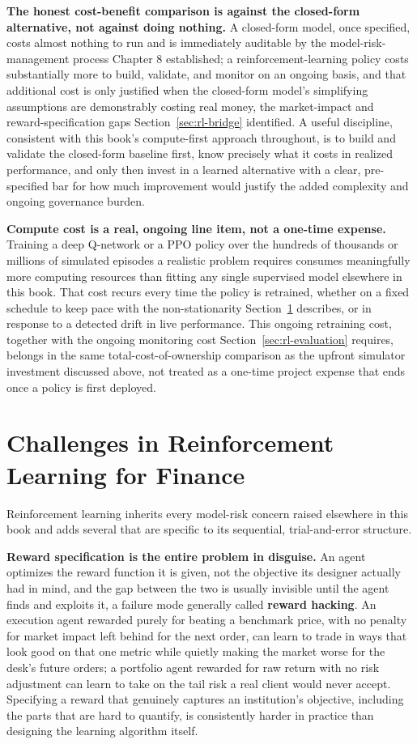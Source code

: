 \documentclass[../ai_in_finance]{subfiles}
\begin{document}
\textbf{The honest cost-benefit comparison is against the closed-form alternative, not against doing nothing.} A closed-form model, once specified, costs almost nothing to run and is immediately auditable by the model-risk-management process Chapter 8 established; a reinforcement-learning policy costs substantially more to build, validate, and monitor on an ongoing basis, and that additional cost is only justified when the closed-form model's simplifying assumptions are demonstrably costing real money, the market-impact and reward-specification gaps Section~\ref{sec:rl-bridge} identified. A useful discipline, consistent with this book's compute-first approach throughout, is to build and validate the closed-form baseline first, know precisely what it costs in realized performance, and only then invest in a learned alternative with a clear, pre-specified bar for how much improvement would justify the added complexity and ongoing governance burden.

\textbf{Compute cost is a real, ongoing line item, not a one-time expense.} Training a deep Q-network or a PPO policy over the hundreds of thousands or millions of simulated episodes a realistic problem requires consumes meaningfully more computing resources than fitting any single supervised model elsewhere in this book. That cost recurs every time the policy is retrained, whether on a fixed schedule to keep pace with the non-stationarity Section~\ref{sec:rl-challenges} describes, or in response to a detected drift in live performance. This ongoing retraining cost, together with the ongoing monitoring cost Section~\ref{sec:rl-evaluation} requires, belongs in the same total-cost-of-ownership comparison as the upfront simulator investment discussed above, not treated as a one-time project expense that ends once a policy is first deployed.

\section{Challenges in Reinforcement Learning for Finance}
\label{sec:rl-challenges}

Reinforcement learning inherits every model-risk concern raised elsewhere in this book and adds several that are specific to its sequential, trial-and-error structure.

\textbf{Reward specification is the entire problem in disguise.} An agent optimizes the reward function it is given, not the objective its designer actually had in mind, and the gap between the two is usually invisible until the agent finds and exploits it, a failure mode generally called \textbf{reward hacking}. An execution agent rewarded purely for beating a benchmark price, with no penalty for market impact left behind for the next order, can learn to trade in ways that look good on that one metric while quietly making the market worse for the desk's future orders; a portfolio agent rewarded for raw return with no risk adjustment can learn to take on the tail risk a real client would never accept. Specifying a reward that genuinely captures an institution's objective, including the parts that are hard to quantify, is consistently harder in practice than designing the learning algorithm itself.
\end{document}
